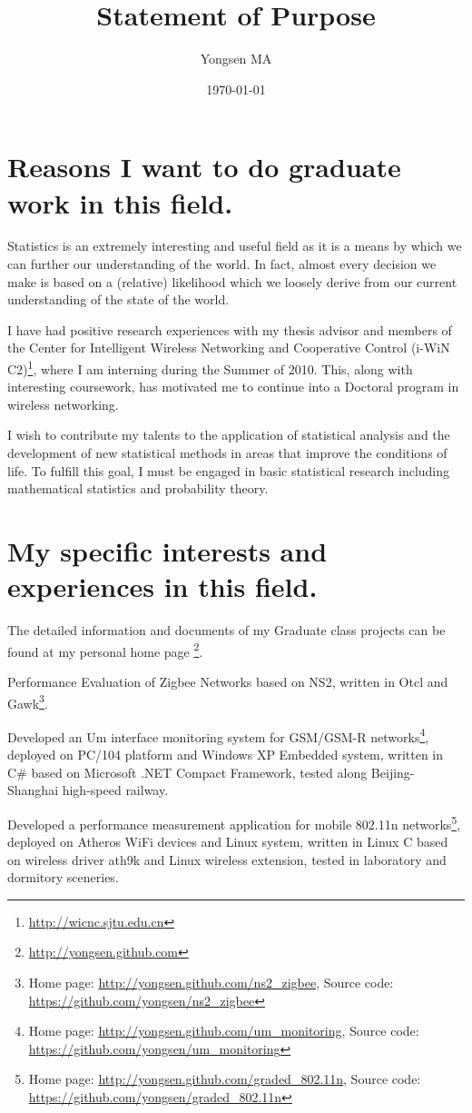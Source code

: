 \documentclass{article}
\title{Statement of Purpose}
\author{Yongsen MA}
\date{\today}
\begin{document}
  \maketitle%

\section{Reasons I want to do graduate work in this field.}
Statistics is an extremely interesting and useful field as it is a means by which we can further our understanding of the world. In fact, almost every decision we make is based on a (relative) likelihood which we loosely derive from our current understanding of the state of the world.

I have had positive research experiences with my thesis advisor and members of the Center for Intelligent Wireless Networking and Cooperative Control (i-WiN C2)\footnote{\url{http://wicnc.sjtu.edu.cn}}, where I am interning during the Summer of 2010. This, along with interesting coursework, has motivated me to continue into a Doctoral program in wireless networking.

I wish to contribute my talents to the application of statistical analysis and the development of new statistical methods in areas that improve the conditions of life. To fulfill this goal, I must be engaged in basic statistical research including mathematical statistics and probability theory.

\section{My specific interests and experiences in this field.}
The detailed information and documents of my Graduate class projects can be found at my personal home page \footnote{\url{http://yongsen.github.com}}.

Performance Evaluation of Zigbee Networks based on NS2, written in Otcl and Gawk\footnote{Home page: \url{http://yongsen.github.com/ns2_zigbee}, Source code: \url{https://github.com/yongsen/ns2_zigbee}}.


Developed an Um interface monitoring system for GSM/GSM-R networks\footnote{Home page: \url{http://yongsen.github.com/um_monitoring}, Source code: \url{https://github.com/yongsen/um_monitoring}}, deployed on PC/104
platform and Windows XP Embedded system, written in C\# based on Microsoft .NET Compact Framework, tested along Beijing-Shanghai high-speed railway.

Developed a performance measurement application for mobile 802.11n networks\footnote{Home page: \url{http://yongsen.github.com/graded_802.11n}, Source code: \url{https://github.com/yongsen/graded_802.11n}}, deployed on Atheros WiFi devices and Linux system, written in Linux C based on wireless driver ath9k and Linux wireless extension, tested in laboratory and dormitory sceneries.
\end{document}
